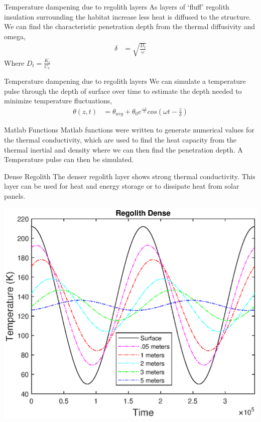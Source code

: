 \documentclass{beamer}
\begin{document}
  
\begin{frame}{Temperature dampening due to regolith layers }
As layers of `fluff' regolith insulation surrounding the habitat increase less heat is diffused to the structure.  
We can find the characteristic penetration depth from the thermal diffusivity and omega,
\begin{align*}
\delta & = \sqrt{\frac{D_t}{\omega}}
\end{align*}
Where $D_t = \frac{K_t}{C_v}$

\end{frame}




  
\begin{frame}{Temperature dampening due to regolith layers }
We can simulate a temperature pulse through the depth of surface over time to estimate the depth needed to minimize temperature fluctuations,
\begin{align*}
\theta(z,t) & = \theta_{avg}+\theta_0 e^{\frac{-z}{\delta}} cos(\omega t- \frac{z}{\delta})
\end{align*}

\end{frame}





\begin{frame}{Matlab Functions}
 Matlab functions were written to generate numerical values for the thermal conductivity, which are used to find the heat capacity from the thermal inertial and density where we can then find the penetration depth. A Temperature pulse can then be simulated.
\end{frame}

\begin{frame}{ Dense Regolith}
The denser regolith layer shows strong thermal conductivity. This layer can be used for heat and energy storage or to dissipate heat from solar panels.
 \begin{center}
             \includegraphics[width= .75\textwidth]{Regolith_Pulse.eps}   
      \end{center}  
\end{frame}
\end{document}
